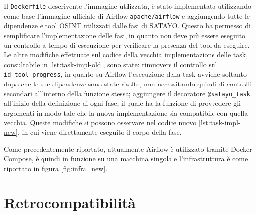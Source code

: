 Il \texttt{Dockerfile} descrivente l'immagine utilizzata, è stato implementato utilizzando
come base l'immagine ufficiale di Airflow \texttt{apache/airflow} e aggiungendo
tutte le dipendenze e tool OSINT utilizzati dalle fasi di SATAYO. Questo ha permesso
di semplificare l'implementazione delle fasi, in quanto non deve più essere
eseguito un controllo a tempo di esecuzione per verificare la presenza del tool
da eseguire. Le altre modifiche effettuate sul codice della vecchia implementazione
delle task, consultabile in \ref{lst:task-impl-old}, sono state: rimuovere il
controllo sul \texttt{id\_tool\_progress}, in quanto su Airflow l'esecuzione
della task avviene soltanto dopo che le sue dipendenze sono state risolte, non necessitando
quindi di controlli secondari all'interno della funzione stessa; aggiungere il
decoratore \texttt{@satayo\_task} all'inizio della definizione di ogni fase, il
quale ha la funzione di provvedere gli argomenti in modo tale che la nuova
implementazione sia compatibile con quella vecchia. Queste modifiche si possono osservare
nel codice nuovo \ref{lst:task-impl-new}, in cui viene direttamente eseguito il
corpo della fase.

Come precedentemente riportato, attualmente Airflow è utilizzato tramite Docker Compose,
è quindi in funzione su una macchina singola e l'infrastruttura è come riportato
in figura \ref{fig:infra_new}.

\pagebreak




\section{Retrocompatibilità}
\label{sec:retrocompatibility}

